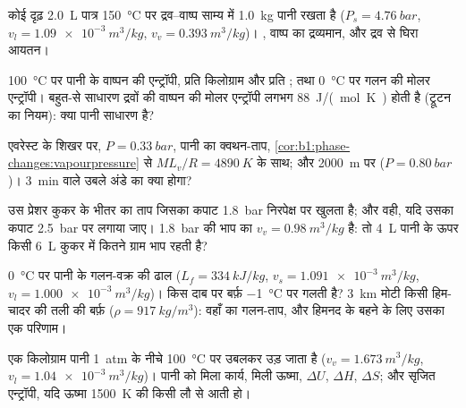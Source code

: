 \begin{exercise}[$\star$]\label{exo:b1:phase-changes:3}
कोई दृढ़ \qty{2.0}{L} पात्र \qty{150}{\degreeCelsius} पर द्रव--वाष्प साम्य
में \qty{1.0}{kg} पानी रखता है ($P_s =
\qty{4.76}{bar}$, $v_l = \qty{1.09e-3}{m^3/kg}$, $v_v = \qty{0.393}{m^3/kg}$)।
, वाष्प का द्रव्यमान, और द्रव से घिरा आयतन।
\end{exercise}

\begin{exercise}[$\star$]\label{exo:b1:phase-changes:4}
\qty{100}{\degreeCelsius} पर पानी के वाष्पन की एन्ट्रॉपी, प्रति किलोग्राम
और प्रति ; तथा \qty{0}{\degreeCelsius} पर गलन की मोलर एन्ट्रॉपी। बहुत-से
साधारण द्रवों की वाष्पन की मोलर एन्ट्रॉपी लगभग
\qty{88}{J/(mol.K)} होती है (ट्रूटन का नियम): क्या पानी साधारण है?
\end{exercise}

\begin{exercise}[$\star\star$]\label{exo:b1:phase-changes:5}
एवरेस्ट के शिखर पर, $P =
\qty{0.33}{bar}$, पानी का क्वथन-ताप, \cref{cor:b1:phase-changes:vapourpressure}
से $ML_v/R = \qty{4890}{K}$ के साथ; और \qty{2000}{m} पर ($P = \qty{0.80}{bar}$)।
\qty{3}{min} वाले उबले अंडे का क्या होगा?
\end{exercise}

\begin{exercise}[$\star\star$]\label{exo:b1:phase-changes:6}
उस प्रेशर कुकर के भीतर का ताप जिसका कपाट \qty{1.8}{bar} निरपेक्ष पर खुलता
है; और वही, यदि उसका कपाट \qty{2.5}{bar} पर लगाया जाए। \qty{1.8}{bar} की
भाप का $v_v = \qty{0.98}{m^3/kg}$ है: तो \qty{4}{L} पानी के ऊपर किसी
\qty{6}{L} कुकर में कितने ग्राम भाप रहती है?
\end{exercise}

\begin{exercise}[$\star\star$]\label{exo:b1:phase-changes:7}
\qty{0}{\degreeCelsius} पर पानी के गलन-वक्र की ढाल ($L_f =
\qty{334}{kJ/kg}$, $v_s = \qty{1.091e-3}{m^3/kg}$, $v_l = \qty{1.000e-3}{m^3/kg}$)।
किस दाब पर बर्फ़ \qty{-1}{\degreeCelsius} पर गलती है? \qty{3}{km} मोटी किसी
हिम-चादर की तली की बर्फ़ ($\rho = \qty{917}{kg/m^3}$): वहाँ का गलन-ताप, और
हिमनद के बहने के लिए उसका एक परिणाम।
\end{exercise}

\begin{exercise}[$\star\star$]\label{exo:b1:phase-changes:8}
एक किलोग्राम पानी \qty{1}{atm} के नीचे \qty{100}{\degreeCelsius} पर उबलकर
उड़ जाता है ($v_v = \qty{1.673}{m^3/kg}$, $v_l = \qty{1.04e-3}{m^3/kg}$)।
पानी को मिला कार्य, मिली ऊष्मा, $\Delta U$, $\Delta H$, $\Delta S$; और
सृजित एन्ट्रॉपी, यदि ऊष्मा \qty{1500}{K} की किसी लौ से आती हो।
\end{exercise}

